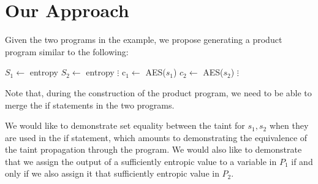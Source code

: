 \documentclass[letterpaper,twocolumn,10pt]{article}
\begin{document}





\section{Our Approach}
Given the two programs in the example, we propose generating a product program similar to the following:

\begin{algorithmic}
\State $S_1 \gets$ entropy
\State $S_2 \gets$ entropy
\State $\vdots$
\State c$_1 \gets$ AES($s_1$)
\State $c_2 \gets$ AES($s_2$)
\EndIf
\State $\vdots$
\EndFunction
\end{algorithmic}

Note that, during the construction of the product program, we need to be able to merge the if statements in the two programs. 

We would like to demonstrate set equality between the taint for $s_1, s_2$ when they are used in the if statement, which amounts to demonstrating the equivalence of the taint propagation through the program. We would also like to demonstrate that we assign the output of a sufficiently entropic value to a variable in $P_1$ if and only if we also assign it that sufficiently entropic value in $P_2$.
\end{document}
